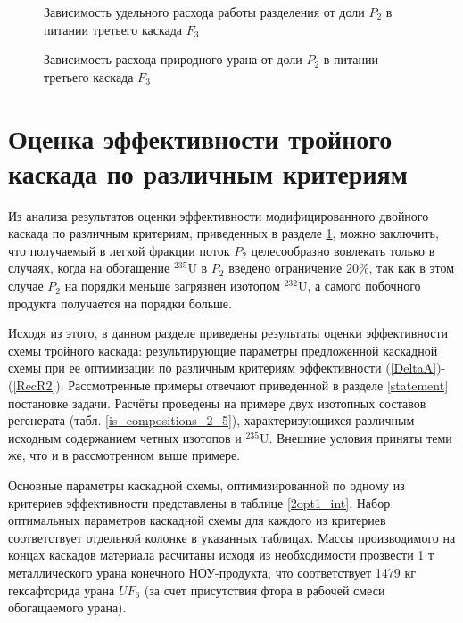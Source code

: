 \begin{figure}[ht]
    \centering
    \begin{minipage}{.5\textwidth}
        \centering
        
  \caption{{Зависимость удельного расхода работы разделения от доли $P_2$ в питании третьего каскада $F_3${\label{FnuP1tr2}}}}
  \end{minipage}%
    \begin{minipage}{.5\textwidth}
      \centering
      
\caption{{Зависимость расхода природного урана от доли $P_2$ в питании третьего каскада $F_3${\label{pFoP1tr2}}}}
    \end{minipage}
\end{figure}

\section{Оценка эффективности тройного каскада по различным критериям}\label{MDKefficiency}

Из анализа результатов оценки эффективности модифицированного двойного каскада по различным критериям, приведенных в разделе \ref{MDKefficiency}, можно заключить, что получаемый в легкой фракции поток $P_2$ целесообразно вовлекать только в случаях, когда на обогащение $^{235}$U в $P_2$ введено ограничение 20\%, так как в этом случае $P_2$ на порядки меньше загрязнен изотопом $^{232}$U, а самого побочного продукта получается на порядки больше.

Исходя из этого, в данном разделе приведены результаты оценки эффективности схемы тройного каскада: результирующие параметры предложенной каскадной схемы при ее оптимизации по различным критериям эффективности (\ref{DeltaA})-(\ref{RecR2}). Рассмотренные примеры отвечают приведенной в разделе \ref{statement} постановке задачи. Расчёты проведены на примере двух изотопных составов регенерата (табл. \ref{is_compositions_2_5}), характеризующихся различным исходным содержанием четных изотопов и $^{235}$U. Внешние условия приняты теми же, что и в рассмотренном выше примере. 

Основные параметры каскадной схемы, оптимизированной по одному из критериев эффективности представлены в таблице \ref{2opt1_int}.
Набор оптимальных параметров каскадной схемы для каждого из критериев соответствует отдельной колонке в указанных таблицах. 
Массы производимого на концах каскадов материала расчитаны исходя из необходимости прозвести 1 т металлического урана конечного НОУ-продукта, что соответствует 1479 кг гексафторида урана $UF_6$ (за счет присутствия фтора в рабочей смеси обогащаемого урана).

